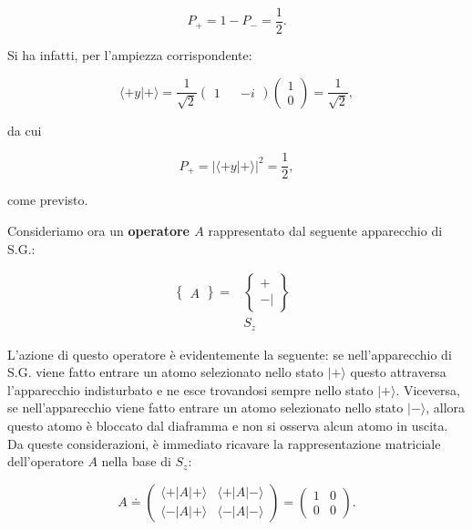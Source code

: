 \begin{equation}
P_+= 1-P_-=\frac{1}{2} .
\end{equation}

Si ha infatti, per l'ampiezza corrispondente:

\begin{equation}
\langle +y | + \rangle = \frac{1}{\sqrt{2}}
\begin{pmatrix}
1 && -i
\end{pmatrix}
\begin{pmatrix}
1 \\
0
\end{pmatrix}=
\frac{1}{\sqrt{2}} ,
\end{equation}

da cui

\begin{equation}
P_+= |\langle +y | + \rangle |^2=\frac{1}{2} ,
\end{equation}

come previsto.

Consideriamo ora un \textbf{operatore $A$} rappresentato dal seguente apparecchio di S.G.:

\begin{eqnarray}
\begin{Bmatrix}
 A
\end{Bmatrix}
=
&\begin{Bmatrix}
 +  \\ - |  
\end{Bmatrix}&\\
&S_z& \nonumber 
\end{eqnarray}

L'azione di questo operatore è evidentemente la seguente:
se nell'apparecchio di S.G. viene fatto entrare un atomo selezionato nello stato $| + \rangle$ questo attraversa l'apparecchio indisturbato e ne esce trovandosi sempre nello stato $| + \rangle $. Viceversa, se nell'apparecchio viene fatto entrare un atomo selezionato nello stato $| - \rangle $, allora questo atomo è bloccato dal diaframma e non si osserva alcun atomo in uscita. Da queste considerazioni, è immediato ricavare la rappresentazione matriciale dell'operatore $A$ nella base di $S_z$:

\begin{equation}
A \doteq 
\begin{pmatrix}
\langle + | A | + \rangle & \langle + | A | - \rangle \\
\langle - | A | + \rangle & \langle - | A | - \rangle
\end{pmatrix}=
\begin{pmatrix}
1 & 0\\
0 & 0
\end{pmatrix} .
\end{equation}

